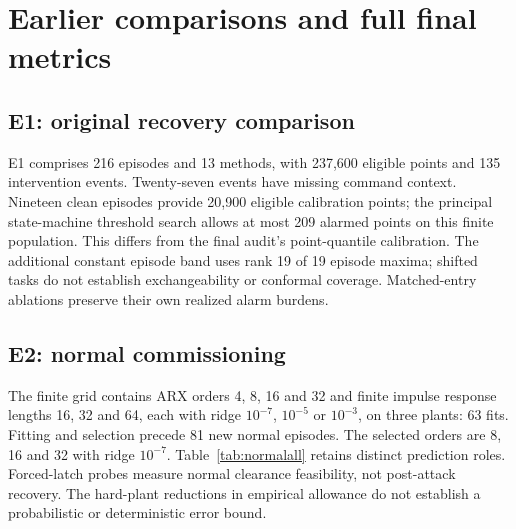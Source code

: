 \section{Earlier comparisons and full final metrics}\label{app:earlier}

\subsection{E1: original recovery comparison}
E1 comprises 216 episodes and 13 methods, with 237,600 eligible points and 135 intervention events. Twenty-seven events have missing command context. Nineteen clean episodes provide 20,900 eligible calibration points; the principal state-machine threshold search allows at most 209 alarmed points on this finite population. This differs from the final audit's point-quantile calibration. The additional constant episode band uses rank 19 of 19 episode maxima; shifted tasks do not establish exchangeability or conformal coverage. Matched-entry ablations preserve their own realized alarm burdens.
\begin{table}[t]\centering
\caption{E1 attack and recovery outcomes, retained from the saved presentation. Clearance counts condition on detected events with measured return.}
\setlength{\tabcolsep}{3pt}
\end{table}
\begin{table}[t]\centering
\caption{E1 additional metrics. Unknown states remain eligible, cannot count as detections, and receive AP score $-1$, below valid nonnegative scores.}
\setlength{\tabcolsep}{3pt}
\end{table}
\subsection{E2: normal commissioning}
The finite grid contains ARX orders 4, 8, 16 and 32 and finite impulse response lengths 16, 32 and 64, each with ridge $10^{-7}$, $10^{-5}$ or $10^{-3}$, on three plants: 63 fits. Fitting and selection precede 81 new normal episodes. The selected orders are 8, 16 and 32 with ridge $10^{-7}$. Table~\ref{tab:normalall} retains distinct prediction roles. Forced-latch probes measure normal clearance feasibility, not post-attack recovery. The hard-plant reductions in empirical allowance do not establish a probabilistic or deterministic error bound.
\begin{table}[t]\centering
\caption{E2 complete normal-reference comparison. Each row has 29,700 eligible observations and 108 forced-latch probes. Selected reference and selected ARX are identical and appear once.}\label{tab:normalall}
\setlength{\tabcolsep}{4pt}
\end{table}
